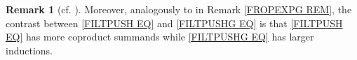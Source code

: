 \documentclass[a4paper,10pt
,draft
]{article}%
\numberwithin{equation}{section}
\numberwithin{figure}{section}
\theoremstyle{definition} %
\newtheorem{remark}[equation]{Remark}%
\newcommand{\1}{\ensuremath{\mathbbm 1}}%
\newcommand{\OC}{\Omega_{\mathfrak C}}
\begin{document}
\begin{remark}[{cf. \cite[Prop. 5.66]{BP_geo}}]
Moreover, analogously to in Remark \ref{FROPEXPG REM},
the contrast between
\eqref{FILTPUSH EQ} and \eqref{FILTPUSHG EQ}
is that \eqref{FILTPUSH EQ} has more coproduct summands while 
\eqref{FILTPUSHG EQ}
has larger inductions.
\end{remark}



\end{document}
